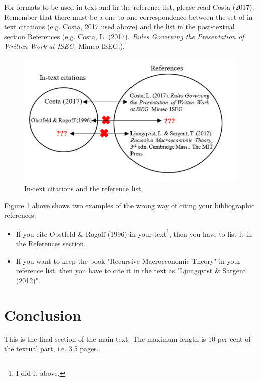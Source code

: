 \documentclass [12pt,a4paper,oneside]{article}
\begin{document}
For formats to be used in-text and in the reference list, please read Costa (2017). Remember that there must be a one-to-one correspondence between the set of in-text citations (e.g. Costa, 2017 used above) and the list in the post-textual section References (e.g. Costa, L. (2017). \textit{Rules Governing the Presentation of Written Work at ISEG}. Mimeo ISEG.).


\begin{figure}[h]%
\centering

\includegraphics[scale=0.8]{citation_errors}

\caption{In-text citations and the reference list.}
\label{fig:citation_errors}

\end{figure}

Figure \ref{fig:citation_errors} above shows two examples of the wrong way of citing your bibliographic references:

\begin{itemize}
\item If you cite Obstfeld \& Rogoff (1996) in your text\footnote{I did it above.}, then you have to list it in the References section.
\item If you want to keep the book "Recursive Macroeconomic Theory" in your reference list, then you have to cite it in the text as "Ljungqvist \& Sargent (2012)".
\end{itemize}


\section{Conclusion}

This is the final section of the main text. The maximum length is 10 per cent of the textual part, i.e. 3.5 pages.
\end{document}
